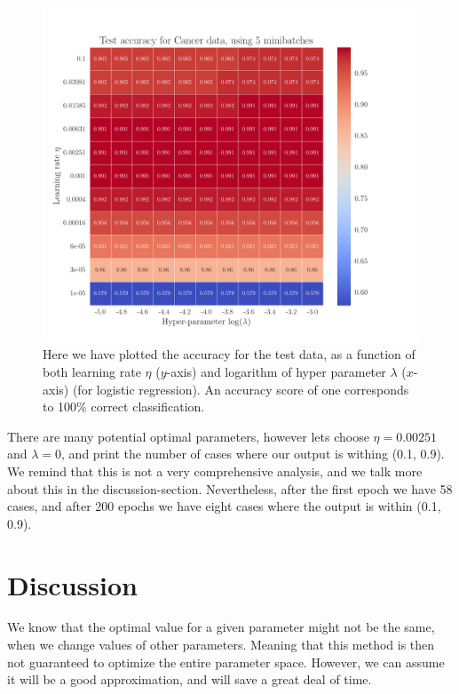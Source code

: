 \documentclass[12pt]{extarticle}
\begin{document}
\begin{figure}[h]
	\includegraphics[width=\linewidth]{../output/plots/reg_Cancer__lambda_eta__Test_accuracy__860729.pdf}
	\caption{Here we have plotted the accuracy for the test data, as a function of both learning rate $\eta$ ($y$-axis) and logarithm of hyper parameter $\lambda$ ($x$-axis) (for logistic regression). An accuracy score of one corresponds to 100\% correct classification.}\label{fig:logreg_eta_lambda}
\end{figure}

There are many potential optimal parameters, however lets choose $\eta= 0.00251$ and $\lambda = 0$, and print the number of cases where our output is withing (0.1, 0.9). We remind that this is not a very comprehensive analysis, and we talk more about this in the discussion-section. Nevertheless, after the first epoch we have 58 cases, and after 200 epochs we have eight cases where the output is within (0.1, 0.9).

\clearpage

\section{Discussion}

We know that the optimal value for a given parameter might not be the same, when we change values of other parameters. Meaning that this method is then not guaranteed to optimize the entire parameter space. However, we can assume it will be a good approximation, and will save a great deal of time.
\end{document}
